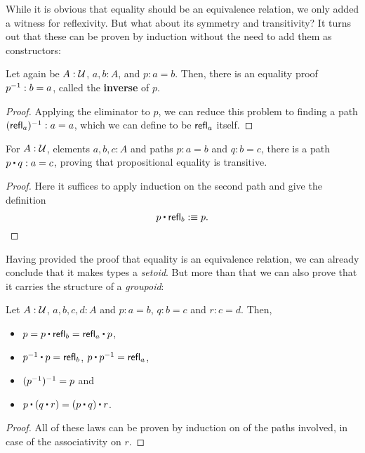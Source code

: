 While it is obvious that equality should be an equivalence relation,
we only added a witness for reflexivity.
But what about its symmetry and transitivity?
It turns out that these can be proven by induction without the need
to add them as constructors:
\begin{lemma}
Let again be $A : \mathcal{U}$, $a, b : A$, and $p : a = b$.
Then, there is an equality proof $p^{-1} : b = a$, called the \textbf{inverse}
of $p$.
\end{lemma}

\begin{proof}
Applying the eliminator to $p$, we can reduce this problem to finding a path
$(\mathsf{refl}_a)^{-1} : a = a$, which we can define to be $\mathsf{refl}_a$ itself.
\end{proof}

\begin{lemma}
For $A : \mathcal{U}$, elements $a, b, c : A$ and paths $p : a = b$ and $q : b = c$,
there is a path $p \ct q : a = c$, proving that propositional equality is
transitive.
\end{lemma}

\begin{proof}
Here it suffices to apply induction on the second path and give the definition
\begin{equation*}
p \ct \refl_b :\equiv p \text{.}
\end{equation*}
\end{proof}

Having provided the proof that equality is an equivalence relation,
we can already conclude that it makes types a \emph{setoid}.
But more than that we can also prove that it carries the structure of a
\emph{groupoid}:
\begin{lemma}
Let $A : \mathcal{U}$, $a, b, c, d : A$ and $p : a = b$, $q : b = c$ and $r : c = d$.
Then,
\begin{itemize}
\item $p = p \ct \refl_b = \refl_a \ct p$,
\item $p\inv \ct p = \refl_b$, $p \ct p\inv = \refl_a$,
\item $(p^{-1})^{-1} = p$ and
\item $p \ct (q \ct r) = (p \ct q) \ct r$.
\end{itemize}
\end{lemma}

\begin{proof}
All of these laws can be proven by induction on of the paths involved,
in case of the associativity on $r$.
\end{proof}

